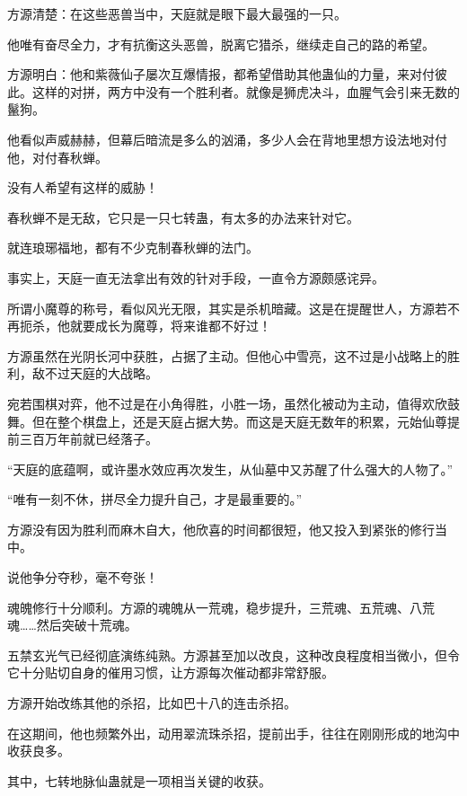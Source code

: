 \begin{this_body}
方源清楚：在这些恶兽当中，天庭就是眼下最大最强的一只。

他唯有奋尽全力，才有抗衡这头恶兽，脱离它猎杀，继续走自己的路的希望。

方源明白：他和紫薇仙子屡次互爆情报，都希望借助其他蛊仙的力量，来对付彼此。这样的对拼，两方中没有一个胜利者。就像是狮虎决斗，血腥气会引来无数的鬣狗。

他看似声威赫赫，但幕后暗流是多么的汹涌，多少人会在背地里想方设法地对付他，对付春秋蝉。

没有人希望有这样的威胁！

春秋蝉不是无敌，它只是一只七转蛊，有太多的办法来针对它。

就连琅琊福地，都有不少克制春秋蝉的法门。

事实上，天庭一直无法拿出有效的针对手段，一直令方源颇感诧异。

所谓小魔尊的称号，看似风光无限，其实是杀机暗藏。这是在提醒世人，方源若不再扼杀，他就要成长为魔尊，将来谁都不好过！

方源虽然在光阴长河中获胜，占据了主动。但他心中雪亮，这不过是小战略上的胜利，敌不过天庭的大战略。

宛若围棋对弈，他不过是在小角得胜，小胜一场，虽然化被动为主动，值得欢欣鼓舞。但在整个棋盘上，还是天庭占据大势。而这是天庭无数年的积累，元始仙尊提前三百万年前就已经落子。

“天庭的底蕴啊，或许墨水效应再次发生，从仙墓中又苏醒了什么强大的人物了。”

“唯有一刻不休，拼尽全力提升自己，才是最重要的。”

方源没有因为胜利而麻木自大，他欣喜的时间都很短，他又投入到紧张的修行当中。

说他争分夺秒，毫不夸张！

魂魄修行十分顺利。方源的魂魄从一荒魂，稳步提升，三荒魂、五荒魂、八荒魂……然后突破十荒魂。

五禁玄光气已经彻底演练纯熟。方源甚至加以改良，这种改良程度相当微小，但令它十分贴切自身的催用习惯，让方源每次催动都非常舒服。

方源开始改练其他的杀招，比如巴十八的连击杀招。

在这期间，他也频繁外出，动用翠流珠杀招，提前出手，往往在刚刚形成的地沟中收获良多。

其中，七转地脉仙蛊就是一项相当关键的收获。

\end{this_body}

